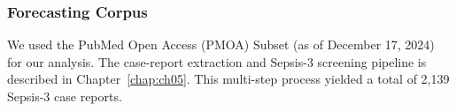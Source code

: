 \subsubsection{Forecasting Corpus}
We used the PubMed Open Access (PMOA) Subset (as of December 17, 2024) for our analysis.
The case-report extraction and Sepsis-3 screening pipeline is described in Chapter~\ref{chap:ch05}.
This multi-step process yielded a total of 2,139 Sepsis-3 case reports.
\par
